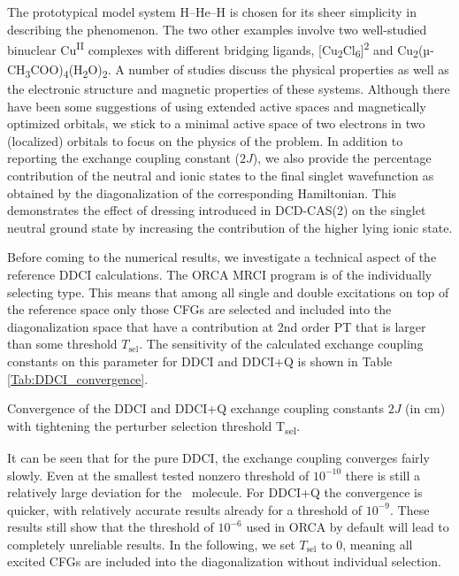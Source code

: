 The prototypical model system H--He--H is chosen for its sheer simplicity in describing the phenomenon. The two other examples involve two well-studied binuclear Cu\textsuperscript{II} complexes with different bridging ligands, [Cu\textsubscript{2}Cl\textsubscript{6}]\textsuperscript{2\textminus} and Cu\textsubscript{2}(µ-CH\textsubscript{3}COO)\textsubscript{4}(H\textsubscript{2}O)\textsubscript{2}. A number of studies discuss the physical properties as well as the electronic structure and magnetic properties of these systems.\cite{HayTH_1975_4884, MalriCCGG_2014_429, FiggiM_1956_3837, GuedeSF_1979_1021} Although there have been some suggestions of using extended active spaces\cite{CalzaACM_2010_185} and magnetically optimized orbitals,\cite{AngelC_2012_34104} we stick to a minimal active space of two electrons in two (localized) orbitals to focus on the physics of the problem. In addition to reporting the exchange coupling constant ($2J$), we also provide the percentage contribution of the neutral and ionic states to the final singlet wavefunction as obtained by the diagonalization of the corresponding Hamiltonian. This demonstrates the effect of dressing introduced in DCD-CAS(2) on the singlet neutral ground state by increasing the contribution of the higher lying ionic state. 

Before coming to the numerical results, we investigate a technical aspect of the reference DDCI calculations. The ORCA MRCI program is of the individually selecting type. This means that among all single and double excitations on top of the reference space only those CFGs are selected and included into the diagonalization space that have a contribution at 2nd order PT that is larger than some threshold $T_\text{sel}$. The sensitivity of the calculated exchange coupling constants on this parameter for DDCI and DDCI+Q is shown in Table \ref{Tab:DDCI_convergence}.
\begin{table}
\small
\centering
\ttabbox
{\caption[Convergence of the exchange coupling constants $2J$ at the DDCI level.]{Convergence of the DDCI and DDCI+Q exchange coupling constants $2J$ (in cm\textsuperscript{}) with tightening the perturber selection threshold T\textsubscript{sel}.}
\label{Tab:DDCI_convergence}}
{}
\end{table}
It can be seen that for the pure DDCI, the exchange coupling converges fairly slowly. Even at the smallest tested nonzero threshold of $10^{-10}$ there is still a relatively large deviation for the \Cuacetate\ molecule. For DDCI+Q the convergence is quicker, with relatively accurate results already for a threshold of $10^{-9}$. These results still show that the threshold of $10^{-6}$ used in ORCA by default will lead to completely unreliable results. In the following, we set $T_\text{sel}$ to 0, meaning all excited CFGs are included into the diagonalization without individual selection.

